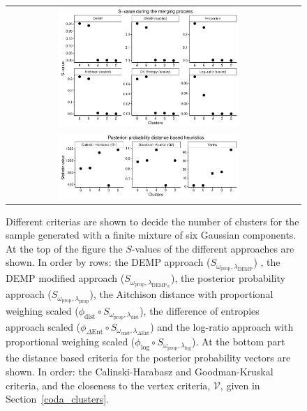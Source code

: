 \documentclass[submit]{smj}
\theoremstyle{definition}
\begin{document}
\begin{figure}[!t]
\begin{center}
\begin{tabular}{cc}
  \includegraphics[width=0.65\textwidth]{figures/gaussian_Svalues.pdf} \\
   \includegraphics[width=0.65\textwidth]{figures/gaussian_statistics.pdf}
 \end{tabular}
\caption{Different criterias are shown to decide the number of clusters for the sample generated with a finite mixture of six Gaussian components. At the top of the figure the $S$-values of the different approaches are shown. In order by rows: the DEMP approach \citep{hennig2010methods} ($S_{\omega_{\text{prop}}, \lambda_{\text{DEMP}}}$) , the DEMP modified approach\citep{longford2014} ($S_{\omega_{\text{prop}}, \lambda_{\text{DEMP}_m}}$), the posterior probability approach ($S_{\omega_{\text{prop}}, \lambda_{\text{prop}}}$), the Aitchison distance with proportional weighing scaled ($\phi_{\text{dist}} \circ S_{\omega_\text{prop}, \lambda_{\text{dist}}}$), the difference of entropies approach scaled ($\phi_{\Delta\text{Ent}} \circ S_{\omega_{\text{cnst}}, \lambda_{\Delta\text{Ent}}}$) and the log-ratio approach with proportional weighing scaled ($\phi_{\log} \circ S_{\omega_{\text{prop}}, \lambda_{\log}}$). At the bottom part the distance based criteria for the posterior probability vectors are shown. In order: the Calinski-Harabasz and Goodman-Kruskal criteria, and the closeness to the vertex criteria, $\mathcal{V}$, given in Section~\ref{coda_clusters}.}\label{gaussian_Svalues}
\end{center}
\end{figure}
\end{document}
